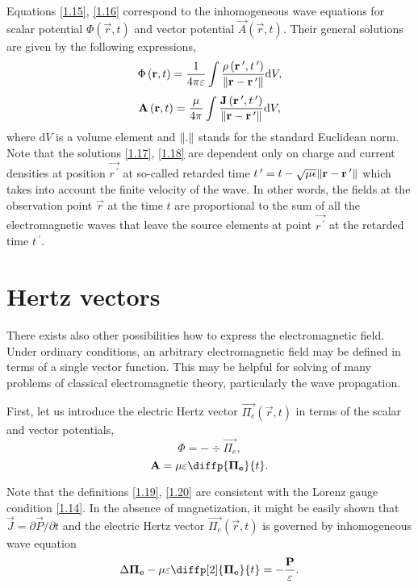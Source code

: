 Equations \ref{1.15}, \ref{1.16} correspond to the inhomogeneous wave equations for scalar potential $ \Phi\left(\vec{r}, t \right) $ and vector potential $ \vec{A}\left(\vec{r}, t \right) $. Their general solutions are given by the following expressions,
\begin{equation}
\label{1.17}
\Phi\left(\mathbf{r}, t \right) = \frac{1}{4 \pi \varepsilon} \int \frac{\rho\left(\mathbf{r^{\: \prime}}, t^{\: \prime} \right)}{\lVert\mathbf{r} - \mathbf{r^{\: \prime}}\rVert} \mathrm{d} V,
\end{equation}
\begin{equation}
\label{1.18}
\mathbf{A}\left(\mathbf{r}, t \right) = \frac{\mu}{4 \pi} \int \frac{\mathbf{J}\left(\mathbf{r^{\: \prime}}, t^{\: \prime} \right)}{\lVert\mathbf{r} - \mathbf{r^{\: \prime}}\rVert} \mathrm{d} V,
\end{equation}
where $ \mathrm{d} V $ is a volume element and $ \lVert.\rVert $ stands for the standard Euclidean norm. Note that the solutions \ref{1.17}, \ref{1.18} are dependent only on charge and current densities at position $ \vec{r^{\: \prime}} $ at so-called retarded time $ t^{\: \prime} = t - \sqrt{\mu \epsilon} \lVert\mathbf{r} - \mathbf{r^{\: \prime}}\rVert $ which takes into account the finite velocity of the wave. In other words, the fields at the observation point $ \vec{r} $ at the time $ t $ are proportional to the sum of all the electromagnetic waves that leave the source elements at point $ \vec{r^{\: \prime}} $ at the retarded time $ t^{\: \prime} $.

\section{Hertz vectors}
There exists also other possibilities how to express the electromagnetic field. Under ordinary conditions, an arbitrary electromagnetic field may be defined in terms of a single vector function. This may be helpful for solving of many problems of classical electromagnetic theory, particularly the wave propagation.

First, let us introduce the electric Hertz vector $ {\vec{\Pi_e}}\left(\vec{r}, t \right) $ in terms of the scalar and vector potentials,
\begin{equation}
\label{1.19}
\Phi = - \div{\vec{\Pi_e}},
\end{equation}
\begin{equation}
\label{1.20}
\vec{A} = \mu \varepsilon \diffp{\vec{\Pi_e}}{t}.
\end{equation}

Note that the definitions \ref{1.19}, \ref{1.20} are consistent with the Lorenz gauge condition \ref{1.14}. In the absence of magnetization, it might be easily shown that $ \vec{J} = \partial{\vec{P}}/\partial{t} $ and the electric Hertz vector $ {\vec{\Pi_e}}\left(\vec{r}, t \right) $ is governed by inhomogeneous wave equation
\begin{equation}
\label{1.21}
\laplace{\vec{\Pi_e}} - \mu \varepsilon \diffp[2]{\vec{\Pi_e}}{t} = -\frac{\vec{P}}{\varepsilon}.
\end{equation}


